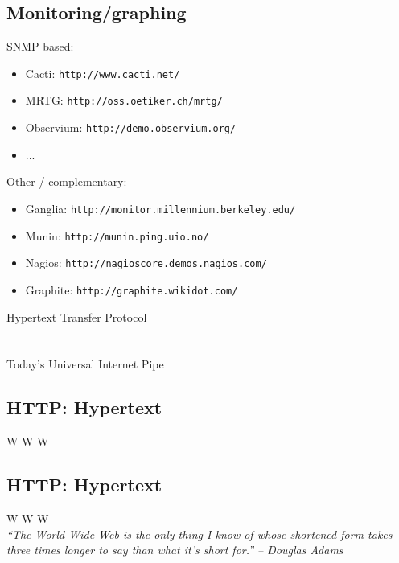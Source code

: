 \documentclass[xga]{xdvislides}
\begin{document}
\subsection{Monitoring/graphing}
SNMP based:
\begin{itemize}
	\item Cacti: \verb+http://www.cacti.net/+
	\item MRTG: \verb+http://oss.oetiker.ch/mrtg/+
	\item Observium: \verb+http://demo.observium.org/+
	\item ...
\end{itemize}
\vspace{.2in}
Other / complementary:
\begin{itemize}
	\item Ganglia: \verb+http://monitor.millennium.berkeley.edu/+
	\item Munin: \verb+http://munin.ping.uio.no/+
	\item Nagios: \verb+http://nagioscore.demos.nagios.com/+
	\item Graphite: \verb+http://graphite.wikidot.com/+
\end{itemize}
\vspace{.5in}

\newpage
\vspace*{\fill}
\begin{center}
	\Hugesize
		Hypertext Transfer Protocol\\ [1em]
	\hspace*{5mm}
	\blueline\\
	\hspace*{5mm}\\
		Today's Universal Internet Pipe
\end{center}
\vspace*{\fill}



\subsection{HTTP: Hypertext}
\vspace{.5in}
\begin{center}
	\Huge
	W W W
\end{center}
\Normalsize

\subsection{HTTP: Hypertext}
\vspace{.5in}
\begin{center}
	\Huge
	W W W
	\\
\vspace{.5in}
	{\em ``The World Wide Web is the only thing I know of whose shortened form
	takes three times longer to say than what it's short for.'' -- Douglas Adams}
\end{center}
\Normalsize
\end{document}
